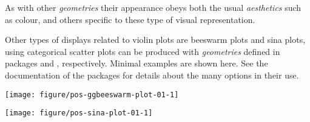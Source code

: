 \documentclass[krantz2]{krantz}\usepackage{knitr}%
\begin{document}
As with other \emph{geometries} their appearance obeys both the usual \emph{aesthetics} such as colour, and others specific to these type of visual representation.

Other types of displays related to violin plots are beeswarm plots and sina plots, using categorical scatter plots can be produced with \emph{geometries} defined in packages  and , respectively. Minimal examples are shown here. See the documentation of the packages for details about the many options in their use.

\begin{knitrout}\footnotesize
{}\color{fgcolor}\begin{kframe}
\begin{alltt}
  \hlopt{+}
  \hlstd{()}
\end{alltt}
\end{kframe}

{\centering \texttt{[image: figure/pos-ggbeeswarm-plot-01-1]} 

}



\end{knitrout}

\begin{knitrout}\footnotesize
{}\color{fgcolor}\begin{kframe}
\begin{alltt}
  \hlopt{+}
  \hlstd{()}
\end{alltt}
\end{kframe}

{\centering \texttt{[image: figure/pos-sina-plot-01-1]} 

}



\end{knitrout}

\end{document}
